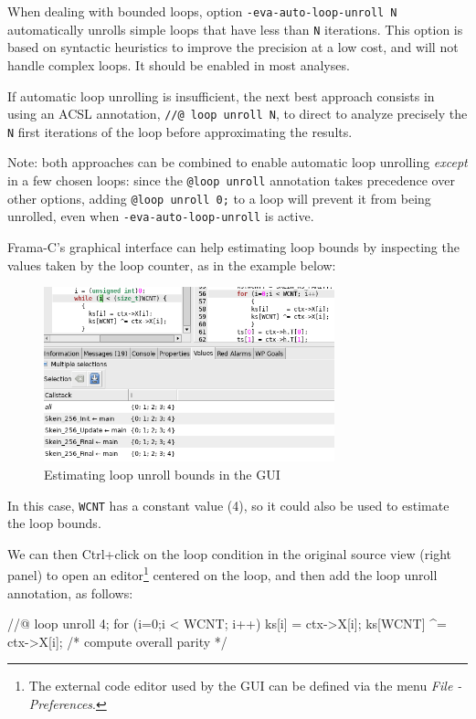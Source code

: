 \documentclass{frama-c-book}
\begin{document}
When dealing with bounded loops, option \verb+-eva-auto-loop-unroll N+
automatically unrolls simple loops that have less than \verb+N+ iterations.
This option is based on syntactic heuristics to improve the precision
at a low cost, and will not handle complex loops.
It should be enabled in most analyses.

If automatic loop unrolling is insufficient, the next best approach consists in
using an ACSL annotation, \verb+//@ loop unroll N+, to direct \Eva{} to analyze
precisely the \verb+N+ first iterations of the loop before approximating the
results.

Note: both approaches can be combined to enable automatic loop unrolling
{\em except} in a few chosen loops: since the \verb+@loop unroll+ annotation
takes precedence over other options, adding \verb+@loop unroll 0;+ to a loop
will prevent it from being unrolled, even when \verb+-eva-auto-loop-unroll+
is active.

Frama-C's graphical interface can help estimating loop bounds by inspecting the
values taken by the loop counter, as in the example below:

\begin{figure}[hbt]
\centering
\includegraphics[width=0.75\textwidth]{gui-images/gui-loop-to-unroll.png}
\caption{Estimating loop unroll bounds in the GUI}
\label{fig:gui-loop-to-unroll}
\end{figure}

In this case, \verb|WCNT| has a constant value (4), so it could also be used
to estimate the loop bounds.

We can then Ctrl+click on the loop condition in the original source view
(right panel) to open an editor\footnote{The external code editor used by the GUI
  can be defined via the menu {\em File - Preferences}.} centered on the loop, and
then add the loop unroll annotation, as follows:

\begin{listing-nonumber}
  //@ loop unroll 4;
  for (i=0;i < WCNT; i++)
      {
      ks[i]     = ctx->X[i];
      ks[WCNT] ^= ctx->X[i];            /* compute overall parity */
      }
\end{listing-nonumber}
\end{document}
